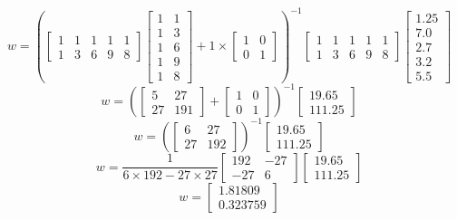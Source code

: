 \documentclass[12pt]{article}
\begin{document}
\begin{enumerate}[leftmargin=\labelsep, label=\textbf{\arabic*.)}]
\begin{itemize}
\begin{minipage}{1\textwidth}
\[                            w = (\begin{bmatrix} 1 & 1 & 1 & 1 & 1 \\ 1 & 3 & 6 & 9 & 8 \end{bmatrix} \begin{bmatrix} 1 & 1 \\ 1 & 3 \\ 1 & 6 \\ 1 & 9 \\ 1 & 8 \end{bmatrix} + 1 \times \begin{bmatrix} 1 & 0 \\ 0 & 1 \end{bmatrix})^{-1} \begin{bmatrix} 1 & 1 & 1 & 1 & 1 \\ 1 & 3 & 6 & 9 & 8 \end{bmatrix} \begin{bmatrix} 1.25 \\ 7.0 \\ 2.7 \\ 3.2 \\ 5.5 \end{bmatrix}
                        \]
                        \[
                            w = (\begin{bmatrix} 5 & 27 \\ 27 & 191 \end{bmatrix} + \begin{bmatrix} 1 & 0 \\ 0 & 1 \end{bmatrix})^{-1} \begin{bmatrix} 19.65 \\ 111.25 \end{bmatrix}
                        \]
                        \[
                            w = (\begin{bmatrix} 6 & 27 \\ 27 & 192 \end{bmatrix})^{-1} \begin{bmatrix} 19.65 \\ 111.25 \end{bmatrix}
                        \]
                        \[
                            w = \frac{1}{6 \times 192 - 27 \times 27} \begin{bmatrix} 192 & -27 \\ -27 & 6 \end{bmatrix} \begin{bmatrix} 19.65 \\ 111.25 \end{bmatrix}
                        \]
                        \[
                            w = \begin{bmatrix} 1.81809 \\ 0.323759 \end{bmatrix}
                        \]


\end{minipage}
\end{itemize}
\end{enumerate}
\end{document}
